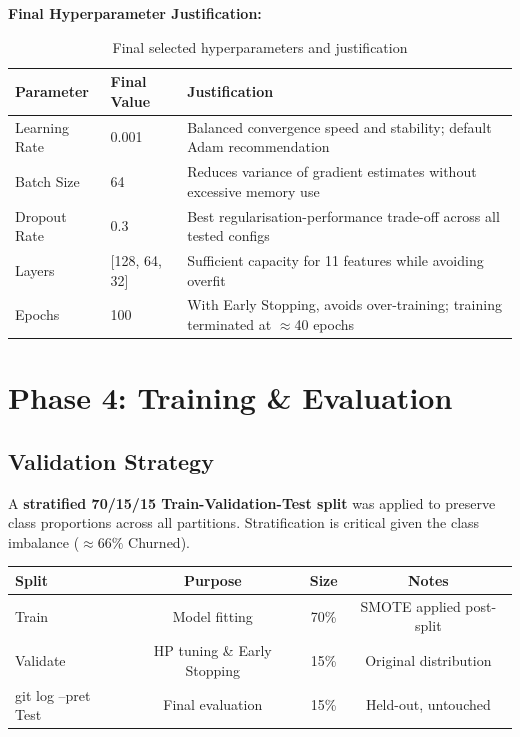 \documentclass[12pt, a4paper]{article}
\begin{document}
\textbf{Final Hyperparameter Justification:}

\begin{table}[H]
\centering
\caption{Final selected hyperparameters and justification}
\label{tab:final_hp}
\begin{tabularx}{\linewidth}{lXX}
\toprule
\textbf{Parameter} & \textbf{Final Value} & \textbf{Justification} \\
\midrule
Learning Rate & 0.001 & Balanced convergence speed and stability; default Adam recommendation \\
Batch Size    & 64    & Reduces variance of gradient estimates without excessive memory use \\
Dropout Rate  & 0.3   & Best regularisation-performance trade-off across all tested configs \\
Layers        & [128, 64, 32] & Sufficient capacity for 11 features while avoiding overfit \\
Epochs        & 100   & With Early Stopping, avoids over-training; training terminated at $\approx$40 epochs \\
\bottomrule
\end{tabularx}
\end{table}

\section{Phase 4: Training \& Evaluation}
\label{sec:phase4}

\subsection{Validation Strategy}
\label{sec:validation}

A \textbf{stratified 70/15/15 Train-Validation-Test split} was applied to preserve class proportions across all partitions. Stratification is critical given the class imbalance ($\approx 66\%$ Churned).

\begin{center}
\begin{tabular}{lccc}
\toprule
\textbf{Split} & \textbf{Purpose} & \textbf{Size} & \textbf{Notes} \\
\midrule
Train    & Model fitting       & 70\% & SMOTE applied post-split \\
Validate & HP tuning \& Early Stopping & 15\% & Original distribution \\
git log --pret
Test     & Final evaluation    & 15\% & Held-out, untouched \\
\bottomrule
\end{tabular}
\end{center}
\end{document}
